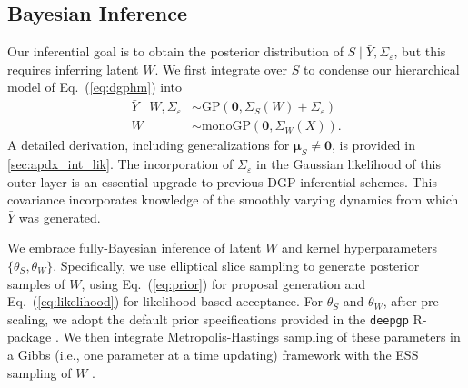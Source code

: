\documentclass[11pt]{article}
\begin{document}
\subsection{Bayesian Inference}\label{sec:inference}

Our inferential goal is to obtain the posterior distribution of 
$S\mid\bar{Y},\Sigma_\varepsilon$, but this requires inferring latent $W$.  
We first integrate over $S$ to condense our hierarchical model of Eq.~(\ref{eq:dgphm}) into
\begin{align}
\label{eq:likelihood}
\bar{Y} \mid W, \Sigma_\varepsilon &\sim \textrm{GP}(\mathbf{0}, \Sigma_S(W) + \Sigma_\varepsilon) \\
\label{eq:prior}
W &\sim \mathrm{monoGP}\left(\mathbf{0}, \Sigma_W(X)\right).
\end{align}
A detailed derivation, including generalizations for 
$\boldsymbol{\mu}_S\neq\mathbf{0}$, is provided in \ref{sec:apdx_int_lik}. 
The incorporation of $\Sigma_\varepsilon$ in the
Gaussian likelihood of this outer layer is an essential upgrade to previous DGP inferential schemes.
This covariance incorporates knowledge of the smoothly varying dynamics from which $\bar{Y}$ was
generated.

We embrace fully-Bayesian inference of latent $W$ and kernel hyperparameters $\{\theta_S, \theta_W\}$.
Specifically, we use elliptical slice sampling \citep[ESS;][]{murray2010elliptical} to 
generate posterior samples of $W$, using Eq.~(\ref{eq:prior}) for proposal generation and 
Eq.~(\ref{eq:likelihood}) for likelihood-based acceptance.  
For $\theta_S$ and $\theta_W$, after pre-scaling, we adopt the default prior specifications 
provided in the {\tt deepgp} {\sf R}-package \citep{deepgp}.
We then integrate Metropolis-Hastings sampling of these parameters in a Gibbs (i.e., one parameter 
at a time updating) framework with the ESS sampling of $W$ \citep{sauer2023active}.
\end{document}
